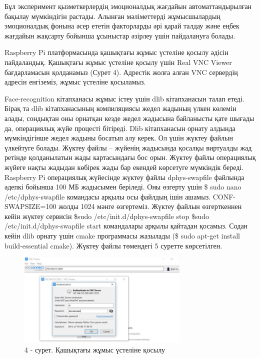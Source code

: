 \begin{multicols}{2}
Бұл эксперимент қызметкерлердің эмоционалдық жағдайын автоматтандырылған
бақылау мүмкіндігін растады. Алынған мәліметтерді жұмысшылардың
эмоционалдық фонына әсер ететін факторларды әрі қарай талдау және еңбек
жағдайын жақсарту бойынша ұсыныстар әзірлеу үшін пайдалануға болады.

Raspberry Pi платформасында қашықтағы жұмыс үстеліне қосылу әдісін
пайдаландық. Қашықтағы жұмыс үстеліне қосылу үшін Real VNC Viewer
бағдарламасын қолданамыз (Сурет 4). Адрестік жолға алған VNC сервердің
адресін енгіземіз, жұмыс үстеліне қосыламыз.

Face-recognition кітапханасы жұмыс істеу үшін dlib кітапханасын талап
етеді. Бірақ та dlib кітапханасының компиляциясы жедел жадының үлкен
көлемін алады, сондықтан оны орнатқан кезде жедел жадысына байланысты
қате шығады да, операциялық жүйе процесті бітіреді. Dlib кітапханасын
орнату алдында мүмкіндігінше жедел жадыны босатып алу керек. Ол үшін
жүктеу файлын үлкейтуге болады. Жүктеу файлы -- жүйенің жадысында
қосалқы виртуалды жад ретінде қолданылатын жады картасындағы бос орын.
Жүктеу файлы операциялық жүйеге нақты жадыдан көбірек жады бар екендей
көрсетуге мүмкіндік береді. Raspberry Pi операциялық жүйесінде жүктеу
файлы dphys-swapfile файлында әдепкі бойынша 100 МБ жадысымен беріледі.
Оны өзгерту үшін \$ sudo nano /etc/dphys-swapfile командасы арқылы осы
файлдың ішін ашамыз. CONF-SWAPSIZE=100 жолды 1024 мәнге өзгертеміз.
Жүктеу файлын өзгерткеннен кейін жүктеу сервисін \$sudo
/etc/init.d/dphys-swapfile stop \$sudo /etc/init.d/dphys-swapfile start
командалары арқылы қайтадан қосамыз. Содан кейін dlib орнату үшін cmake
программасы жазылады (\$ sudo apt-get install build-essential cmake).
Жүктеу файлы төмендегі 5 суретте көрсетілген.
\end{multicols}

\begin{figure}[H]
	\centering
	\includegraphics[width=0.73\textwidth]{media/ict2/image163}
	\caption*{4 - сурет. Қашықтағы жұмыс үстеліне қосылу}
\end{figure}

